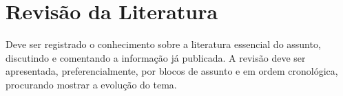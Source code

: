 
\graphicspath{%
  {./Chapter-2/}%
}

\chapter{Revisão da Literatura}%
\label{chpt:lit-rev}

Deve ser registrado o conhecimento sobre a literatura essencial do assunto, discutindo e comentando a informação já publicada.
A revisão deve ser apresentada, preferencialmente, por blocos de assunto e em ordem cronológica, procurando mostrar a evolução do tema.

